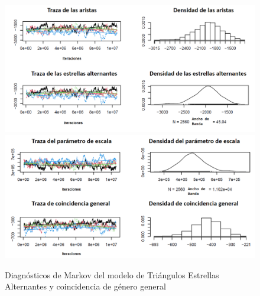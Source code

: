 \begin{figure}[!ht]
\includegraphics[width=1\textwidth]{Tesis/Figures/mcmc_general1.PNG}
\includegraphics[width=1\textwidth]{Tesis/Figures/mcmc_general2.PNG}
\caption{Diagnósticos de Markov del modelo de Triángulos Estrellas Alternantes y coincidencia de género general}
\end{figure}


